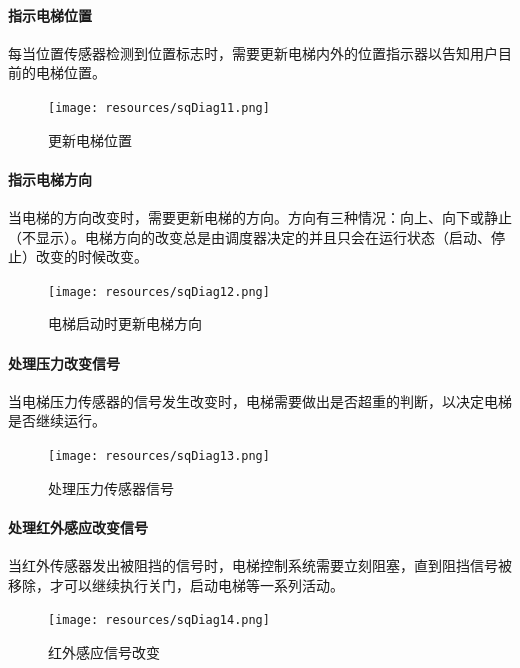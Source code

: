 \begin{minipage}{\textwidth}
\paragraph{指示电梯位置}
每当位置传感器检测到位置标志时，需要更新电梯内外的位置指示器以告知用户目前的电梯位置。
\begin{figure}[H]
	\centering
	\texttt{[image: resources/sqDiag11.png]}
	\caption{更新电梯位置}
	\label{fig:sqDiag11}
\end{figure}
\end{minipage}

\begin{minipage}{\textwidth}
\paragraph{指示电梯方向}
当电梯的方向改变时，需要更新电梯的方向。方向有三种情况：向上、向下或静止（不显示）。电梯方向的改变总是由调度器决定的并且只会在运行状态（启动、停止）改变的时候改变。
\begin{figure}[H]
	\centering
	\texttt{[image: resources/sqDiag12.png]}
	\caption{电梯启动时更新电梯方向}
	\label{fig:sqDiag12}
\end{figure}
\end{minipage}

\begin{minipage}{\textwidth}
\paragraph{处理压力改变信号}
当电梯压力传感器的信号发生改变时，电梯需要做出是否超重的判断，以决定电梯是否继续运行。
\begin{figure}[H]
	\centering
	\texttt{[image: resources/sqDiag13.png]}
	\caption{处理压力传感器信号}
	\label{fig:sqDiag13}
\end{figure}
\end{minipage}

\begin{minipage}{\textwidth}
\paragraph{处理红外感应改变信号}
当红外传感器发出被阻挡的信号时，电梯控制系统需要立刻阻塞，直到阻挡信号被移除，才可以继续执行关门，启动电梯等一系列活动。
\begin{figure}[H]
	\centering
	\texttt{[image: resources/sqDiag14.png]}
	\caption{红外感应信号改变}
	\label{fig:sqDiag14}
\end{figure}
\end{minipage}

